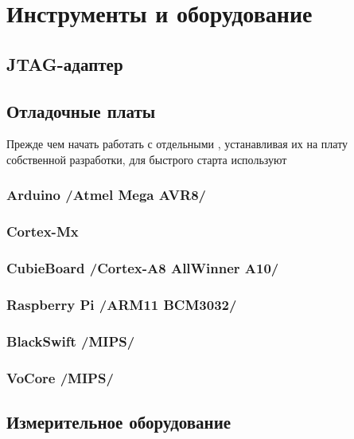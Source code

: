 \chapter{Инструменты и оборудование}



\section{JTAG-адаптер}

% 
% 

\section{Отладочные платы}

Прежде чем начать работать с отдельными \mk, устанавливая их на плату
собственной разработки, для быстрого старта используют 

\subsection{Arduino /Atmel Mega AVR8/}

\subsection{Cortex-Mx} %

\subsection{CubieBoard /Cortex-A8 AllWinner A10/}

\subsection{Raspberry Pi /ARM11 BCM3032/}

\subsection{BlackSwift /MIPS/}

\subsection{VoCore /MIPS/}



\section{Измерительное оборудование}

